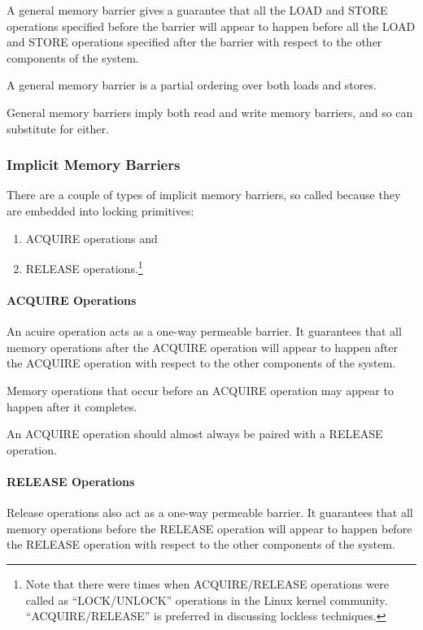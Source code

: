 A general memory barrier gives a guarantee that all the LOAD and STORE
operations specified before the barrier will appear to happen before all
the LOAD and STORE operations specified after the barrier with respect to
the other components of the system.

A general memory barrier is a partial ordering over both loads and stores.

General memory barriers imply both read and write memory barriers, and so
can substitute for either.

\subsubsection{Implicit Memory Barriers}

There are a couple of types of implicit memory barriers, so called
because they are embedded into locking primitives:

\begin{enumerate}
\item	ACQUIRE operations and
\item	RELEASE operations.\footnote{
		Note that there were times when ACQUIRE/RELEASE operations
		were called as ``LOCK/UNLOCK'' operations in the Linux
		kernel community. ``ACQUIRE/RELEASE'' is preferred in
		discussing lockless techniques.}
\end{enumerate}

\paragraph{ACQUIRE Operations}

An acuire operation acts as a one-way permeable barrier.
It guarantees that all memory
operations after the ACQUIRE operation will appear to happen after the ACQUIRE
operation with respect to the other components of the system.

Memory operations that occur before an ACQUIRE operation may appear to happen
after it completes.

An ACQUIRE operation should almost always be paired with a RELEASE operation.

\paragraph{RELEASE Operations}

Release operations also act as a one-way permeable barrier.
It guarantees that all
memory operations before the RELEASE operation will appear to happen before
the RELEASE operation with respect to the other components of the system.

